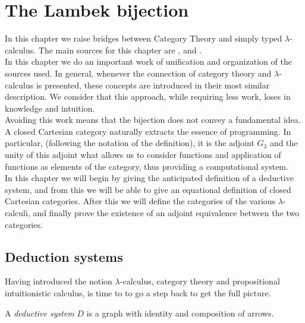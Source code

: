 
\chapter{The Lambek bijection}
\label{chap:4}
\thispagestyle{empty}
In this chapter we raise bridges between Category Theory and simply typed $\lambda$-calculus. The main sources for this chapter are \cite{lambek1988introduction}, \cite{lambek1985cartesian} and \cite[Chapter 6]{selinger2008lecture}.\\

In this chapter we do an important work of unification and organization of the sources used. In general, whenever the connection of category theory and $\lambda$-calculus is presented, these concepts are introduced in their most similar description. We consider that this approach, while requiring less work, loses in knowledge and intuition.\\


Avoiding this work means that the bijection does not convey a fundamental idea. A closed Cartesian category naturally extracts the essence of programming. In particular, (following the notation of the definition), it is the adjoint $G_3$ and the unity of this adjoint what allows us to consider functions and application of functions as elements of the category, thus providing a computational system.\\

In this chapter we will begin by giving the anticipated definition of a deductive system, and from this we will be able to give an equational definition of closed Cartesian categories.  After this we will define the categories of the various $\lambda$-calculi, and finally prove the existence of an adjoint equivalence between the two categories.\\



\section{Deduction systems}
Having introduced the notion $\lambda$-calculus, category theory and propositional intuitionistic calculus, is time to to go a step back to get the full picture.

\begin{definition}
  A \emph{deductive system} $D$ is a graph  with identity and composition of arrows.
\end{definition}

